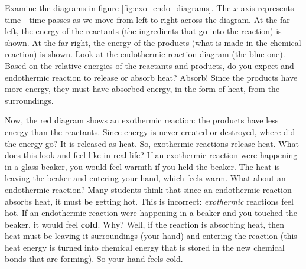 Examine the diagrams in figure \ref{fig:exo_endo_diagrams}. The $x$-axis 
represents time - time passes as we move from left to right across the diagram. 
At the far left, the energy of the reactants (the ingredients that go into the 
reaction) is shown. At the far right, the energy of the products (what is made in 
the chemical reaction) is shown. Look at the endothermic reaction diagram (the blue one). Based on the
relative energies of the reactants and products, do you expect and endothermic
reaction to release or absorb heat? Absorb! Since the products have more
energy, they must have absorbed energy, in the form of heat, from the surroundings.

Now, the red diagram shows an exothermic reaction: 
the products have less energy than the reactants. Since energy is never created or destroyed, where did 
the energy go? It is released as heat. So, exothermic reactions release heat.
What does this look and feel like in real life? If an exothermic reaction were
happening in a glass beaker, you would feel warmth if you held the beaker. The
heat is leaving the beaker and entering your hand, which feels warm. What
about an endothermic reaction? Many students think that since an endothermic
reaction absorbs heat, it must be getting hot. This is incorrect:
\textit{exothermic} reactions feel hot. If an endothermic reaction were
happening in a beaker and you touched the beaker, it would feel \textbf{cold}.
Why? Well, if the reaction is absorbing heat, then heat must be leaving it
surroundings (your hand) and entering the reaction (this heat energy is turned
into chemical energy that is stored in the new chemical bonds that are
forming). So your hand feels cold. %

